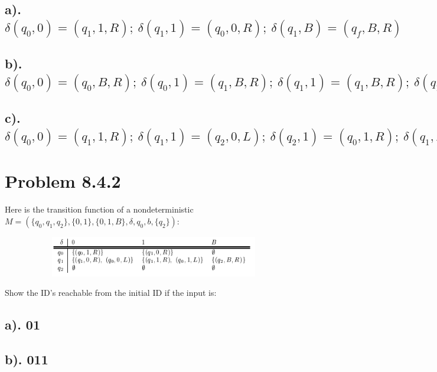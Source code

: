 \documentclass[20pt]{article} %
\begin{document}
\subsection{a). $\delta(q_0, 0) = (q_1, 1, R); \ \delta(q_1, 1) = (q_0, 0, R); \ \delta(q_1, B) = (q_f, B, R)$}
\subsection{b). $\delta(q_0, 0) = (q_0, B, R); \ \delta(q_0, 1) = (q_1, B, R); \ \delta(q_1, 1) = (q_1, B, R); \ \delta(q_1, B) = (q_f, B, R)$}
\subsection{c). $\delta(q_0, 0) = (q_1, 1, R); \ \delta(q_1, 1) = (q_2, 0, L); \ \delta(q_2, 1) = (q_0, 1, R); \ \delta(q_1, B) = (q_f, B, R)$}
\section{Problem 8.4.2}
Here is the transition function of a nondeterministic $M = (\{q_0, q_1, q_2\}, \{0,1\}, \{0,1,B\}, \delta, q_0, b, \{q_2\})$:
\begin{figure}[!htbp]
  	\centering
   	\begin{subfigure}[p]{0.7\linewidth}
    	\includegraphics[width=\linewidth]{./figures/HW9fig2.png}
   	\end{subfigure}
\end{figure} 
Show the ID's reachable from the initial ID if the input is:
\subsection{a). 01}
\subsection{b). 011}
\end{document}

